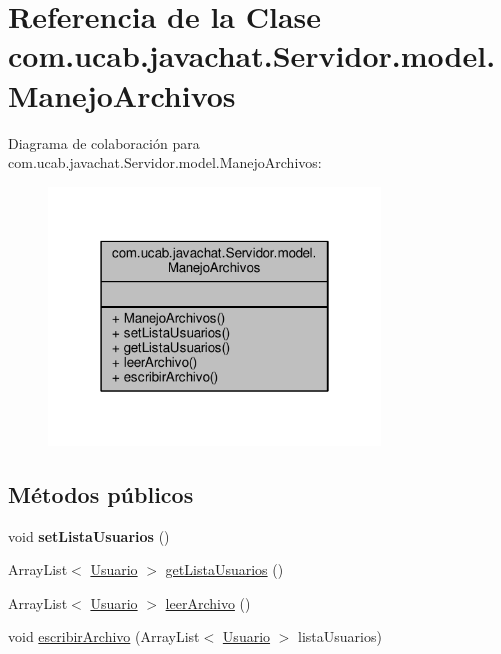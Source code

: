\hypertarget{classcom_1_1ucab_1_1javachat_1_1_servidor_1_1model_1_1_manejo_archivos}{\section{Referencia de la Clase com.\-ucab.\-javachat.\-Servidor.\-model.\-Manejo\-Archivos}
\label{classcom_1_1ucab_1_1javachat_1_1_servidor_1_1model_1_1_manejo_archivos}
}


Diagrama de colaboración para com.\-ucab.\-javachat.\-Servidor.\-model.\-Manejo\-Archivos\-:
\nopagebreak
\begin{figure}[H]
\begin{center}
\leavevmode
\includegraphics[width=250pt]{dd/d79/classcom_1_1ucab_1_1javachat_1_1_servidor_1_1model_1_1_manejo_archivos__coll__graph}
\end{center}
\end{figure}
\subsection*{Métodos públicos}
\begin{DoxyCompactItemize}
\item 
\hypertarget{classcom_1_1ucab_1_1javachat_1_1_servidor_1_1model_1_1_manejo_archivos_a5776d41af3206be2ef21722c54581bdb}{void {\bfseries set\-Lista\-Usuarios} ()}\label{classcom_1_1ucab_1_1javachat_1_1_servidor_1_1model_1_1_manejo_archivos_a5776d41af3206be2ef21722c54581bdb}

\item 
Array\-List$<$ \hyperlink{classcom_1_1ucab_1_1javachat_1_1_servidor_1_1model_1_1_usuario}{Usuario} $>$ \hyperlink{classcom_1_1ucab_1_1javachat_1_1_servidor_1_1model_1_1_manejo_archivos_a659469300b3d725e66d26460107200b6}{get\-Lista\-Usuarios} ()
\item 
Array\-List$<$ \hyperlink{classcom_1_1ucab_1_1javachat_1_1_servidor_1_1model_1_1_usuario}{Usuario} $>$ \hyperlink{classcom_1_1ucab_1_1javachat_1_1_servidor_1_1model_1_1_manejo_archivos_ad6301dc8f0af55ea43b53da2c7f8b0d3}{leer\-Archivo} ()
\item 
void \hyperlink{classcom_1_1ucab_1_1javachat_1_1_servidor_1_1model_1_1_manejo_archivos_af83311d7a6185ca621aad886e6633abd}{escribir\-Archivo} (Array\-List$<$ \hyperlink{classcom_1_1ucab_1_1javachat_1_1_servidor_1_1model_1_1_usuario}{Usuario} $>$ lista\-Usuarios)
\end{DoxyCompactItemize}


